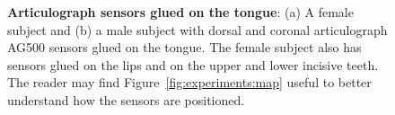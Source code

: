\begin{figure}
	\centering
		\hspace{0.05\textwidth}

	\caption[Articulograph sensors glued on the tongue]{\textbf{Articulograph sensors glued on the tongue}:
	(a) A female subject and (b) a male subject with dorsal and coronal articulograph
	AG500 sensors glued on the tongue. The female subject also has sensors glued
	on the lips and on the upper and lower incisive teeth.
	The reader may find Figure~\ref{fig:experiments:map} useful to better
	understand how the sensors are positioned.}
	\label{fig:linguometer:ag:tongue}
\end{figure}
